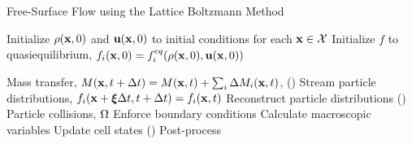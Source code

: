 \begin{algorithm}
\caption{Free-Surface Flow using the Lattice Boltzmann Method} \label{algo:free-surface-complete}
\begin{algorithmic}[1]
   
\Statex {}
\State Initialize $\rho(\mathbf{x}, 0)$ and $\mathbf{u}(\mathbf{x}, 0)$ to initial conditions for each $\mathbf{x} \in \mathcal{X}$
\State Initialize $f$ to quasiequilibrium, $f_i(\mathbf{x}, 0) = f_i^{eq}(\rho(\mathbf{x}, 0), \mathbf{u}(\mathbf{x}, 0))$

\Statex {}
\State Mass transfer, $M(\mathbf{x}, t + \Delta t) = M(\mathbf{x}, t) + \sum_i \Delta M_i(\mathbf{x}, t)$, ()
  \State Stream particle distributions, $f_i(\mathbf{x} + \boldsymbol{\xi} \Delta t, t + \Delta t) = f_i(\mathbf{x}, t)$
  \State Reconstruct particle distributions ()
  \State Particle collisions, $\Omega$
  \State Enforce boundary conditions
  \State Calculate macroscopic variables
  \State Update cell states ()
\EndFor
\Statex
\State Post-process
\EndProcedure
\end{algorithmic}
\end{algorithm}
